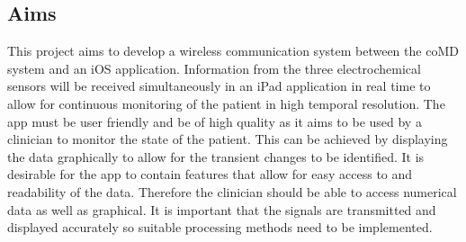 \subsection{Aims}
This project aims to develop a wireless communication system between the coMD system and an iOS application. Information from the three electrochemical sensors will be received simultaneously in an iPad application in real time to allow for continuous monitoring of the patient in high temporal resolution. The app must be user friendly and be of high quality as it aims to be used by a clinician to monitor the state of the patient. This can be achieved by displaying the data graphically to allow for the transient changes to be identified. It is desirable for the app to contain features that allow for easy access to and readability of the data. Therefore the clinician should be able to access numerical data as well as graphical. It is important that the signals are transmitted and displayed accurately so suitable processing methods need to be implemented. 

